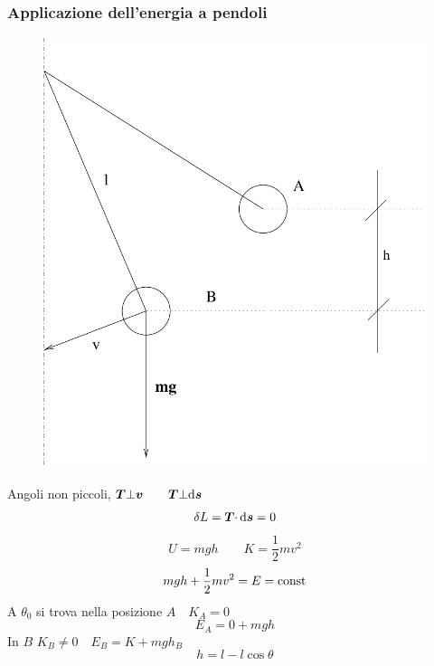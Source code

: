 \subsubsection{Applicazione dell'energia a pendoli}
\begin{figure}[htbp]
\centering
\includegraphics[scale=0.4]{immagini/fisica1/Pendolo_energia}
\end{figure}
Angoli non piccoli, $\boldsymbol{T}\bot \boldsymbol{v} \qquad \boldsymbol{T}\bot \mathrm{d}\boldsymbol{s}$
\begin{equation*}\delta L=\boldsymbol{T} \cdotp \mathrm{d}\boldsymbol{s}=0\end{equation*}
\begin{equation*}U=mgh \qquad K=\frac{1}{2}mv^2\end{equation*}
\begin{equation*}mgh+\frac{1}{2}mv^2=E=\text{const}\end{equation*}
A $\theta_0$ si trova nella posizione $A\quad K_A=0$
\begin{equation*}E_A=0+mgh\end{equation*}
In $B$ $K_B\neq 0\quad E_B=K+mgh_B$
\begin{equation*}h=l-l\cos\theta\end{equation*}
